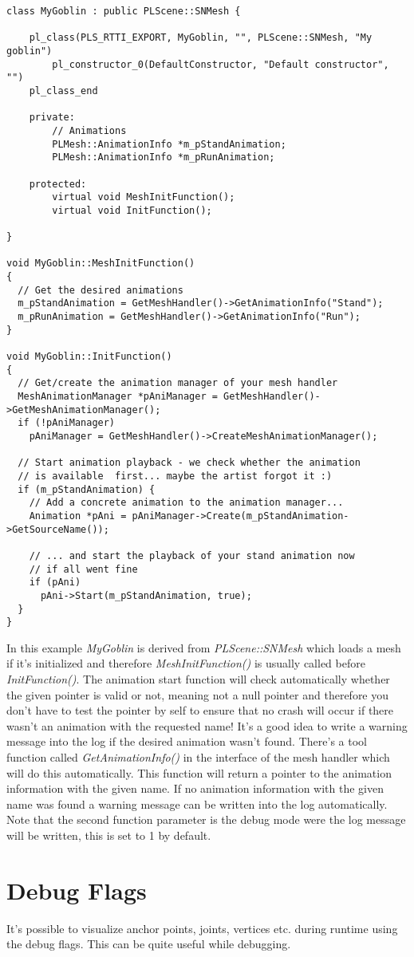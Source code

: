 \begin{lstlisting}[caption=Derived mesh scene node]
class MyGoblin : public PLScene::SNMesh {

	pl_class(PLS_RTTI_EXPORT, MyGoblin, "", PLScene::SNMesh, "My goblin")
		pl_constructor_0(DefaultConstructor, "Default constructor", "")
	pl_class_end

	private:
		// Animations
		PLMesh::AnimationInfo *m_pStandAnimation;
		PLMesh::AnimationInfo *m_pRunAnimation;

	protected:
		virtual void MeshInitFunction();
		virtual void InitFunction();

}

void MyGoblin::MeshInitFunction()
{
  // Get the desired animations
  m_pStandAnimation = GetMeshHandler()->GetAnimationInfo("Stand");
  m_pRunAnimation = GetMeshHandler()->GetAnimationInfo("Run");
}

void MyGoblin::InitFunction()
{
  // Get/create the animation manager of your mesh handler
  MeshAnimationManager *pAniManager = GetMeshHandler()->GetMeshAnimationManager();
  if (!pAniManager)
    pAniManager = GetMeshHandler()->CreateMeshAnimationManager();

  // Start animation playback - we check whether the animation
  // is available  first... maybe the artist forgot it :)
  if (m_pStandAnimation) {
    // Add a concrete animation to the animation manager...
    Animation *pAni = pAniManager->Create(m_pStandAnimation->GetSourceName());

    // ... and start the playback of your stand animation now
    // if all went fine
    if (pAni)
      pAni->Start(m_pStandAnimation, true);
  }
}
\end{lstlisting}

In this example \emph{MyGoblin} is derived from \emph{PLScene::SNMesh} which loads a mesh if it's initialized and therefore \emph{MeshInitFunction()} is usually called before \emph{InitFunction()}. The animation start function will check automatically whether the given pointer is valid or not, meaning not a null pointer and therefore you don't have to test the pointer by self to ensure that no crash will occur if there wasn't an animation with the requested name! It's a good idea to write a warning message into the log if the desired animation wasn't found. There's a tool function called \emph{GetAnimationInfo()} in the interface of the mesh handler which will do this automatically. This function will return a pointer to the animation information with the given name. If no animation information with the given name was found a warning message can  be written into the log automatically. Note that the second function parameter is the debug mode were the log message will be written, this is set to 1 by default.




\section{Debug Flags}
It's possible to visualize anchor points, joints, vertices etc. during runtime using the debug flags. This can be quite useful while debugging.
